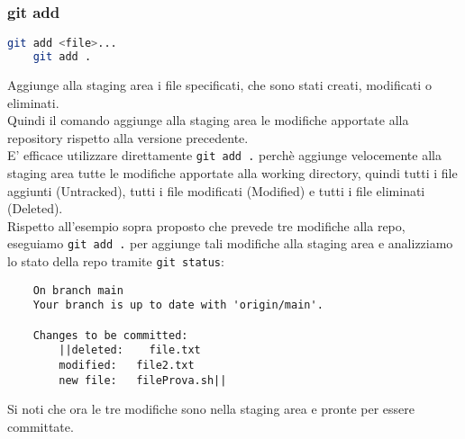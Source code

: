 \subsubsection{git add}
\begin{lstlisting}[language=bash]
	git add <file>...
	git add .
\end{lstlisting}
Aggiunge alla staging area i file specificati, che sono stati creati, modificati o eliminati.\\
Quindi il comando aggiunge alla staging area le modifiche apportate alla repository rispetto alla versione precedente.\\
E' efficace utilizzare direttamente \texttt{git add .} perchè aggiunge velocemente alla staging area tutte le modifiche apportate alla working directory, quindi tutti i file aggiunti (Untracked), tutti i file modificati (Modified) e tutti i file eliminati (Deleted).\vspace{.3cm}\\
Rispetto all'esempio sopra proposto che prevede tre modifiche alla repo, eseguiamo \texttt{git add .} per aggiunge tali modifiche alla staging area e analizziamo lo stato della repo tramite \texttt{git status}:
\begin{lstlisting}
	On branch main
	Your branch is up to date with 'origin/main'.      
	
	Changes to be committed:
		||deleted:    file.txt
		modified:   file2.txt
		new file:   fileProva.sh||
\end{lstlisting}
Si noti che ora le tre modifiche sono nella staging area e pronte per essere committate.

\newpage
